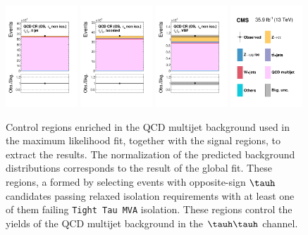 \begin{figure}[!htbp]
\centering
     \includegraphics[width=0.24\textwidth]{higgs_to_taus/plots/Figure_004-a.pdf}
     \includegraphics[width=0.24\textwidth]{higgs_to_taus/plots/Figure_004-b.pdf}
     \includegraphics[width=0.24\textwidth]{higgs_to_taus/plots/Figure_004-c.pdf}
     \includegraphics[width=0.24\textwidth]{higgs_to_taus/plots/Figure_004-d.pdf}
     \caption{Control regions enriched in the QCD multijet background used in the maximum likelihood fit, 
together with the signal regions, to extract the results. The normalization of the predicted background 
distributions corresponds to the result of the global fit. These regions, a formed by selecting events with 
opposite-sign $\tauh$ candidates passing relaxed isolation requirements with at least one of them
failing \texttt{Tight Tau MVA} isolation. These regions control the yields of the QCD multijet background 
in the $\tauh\tauh$ channel.}
     \label{fig:htt_qcd_CR4}
\end{figure}


